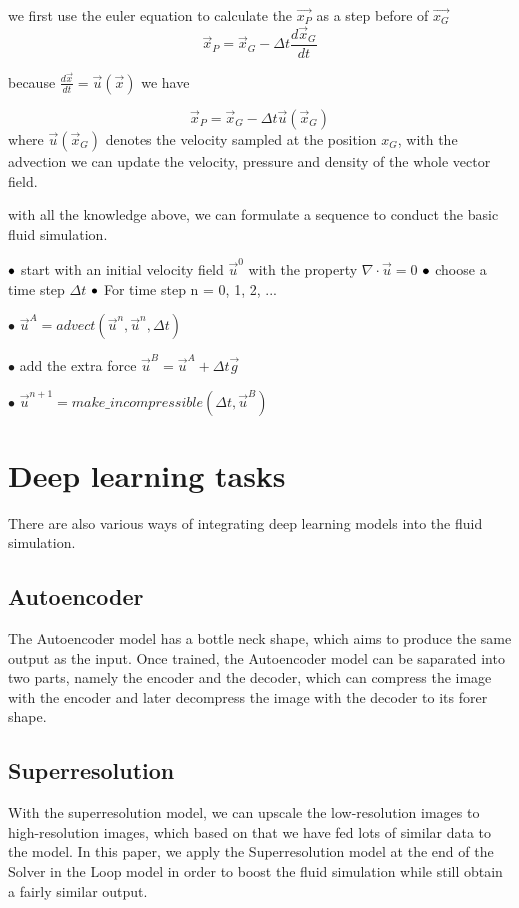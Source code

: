 \documentclass[a4paper,12pt,twoside]{report}
\begin{document}
we first use the euler equation to calculate the $\vec{x_P}$ as a step before of $\vec{x_G}$
\begin{equation}
\vec x_P=\vec x_G-\Delta t\frac{d\vec x_G}{dt}
\end{equation}

because $\frac{d\vec x}{dt}=\vec u(\vec x)$ we have

\begin{equation}
\vec x_P=\vec x_G-\Delta t\vec u(\vec x_G)
\end{equation}
where $\vec u(\vec x_G)$ denotes the velocity sampled at the position $x_G$, with the advection we can update the velocity, pressure and density of the whole vector field.

with all the knowledge above, we can formulate a sequence to conduct the basic fluid simulation.

$\\\bullet$ start with an initial velocity field $\vec{u}^{0}$ with the property ${\nabla}\cdot\vec{u} = 0$
$\\\bullet$ choose a time step $\Delta t$ 
$\\\bullet$ For time step n = 0, 1, 2, ...
\par$\bullet$  $\vec{u}^{A} = advect(\vec{u}^{n}, \vec{u}^{n}, \Delta t)$
 \par$\bullet$  add the extra force $\vec{u}^{B} = \vec{u}^{A} + \Delta t\vec{g}$
 \par$\bullet$  $\vec{u}^{n+1} =make\_incompressible(\Delta t, \vec{u}^{B})$


\section{Deep learning tasks}
There are also various ways of integrating deep learning models into the fluid simulation.
\subsection{Autoencoder}
The Autoencoder model has a bottle neck shape, which aims to produce the same output as the input. Once trained, the Autoencoder model can be saparated into two parts, namely the encoder and the decoder, which can compress the image with the encoder and later decompress the image with the decoder to its forer shape.
\subsection{Superresolution}
With the superresolution model, we can upscale the low-resolution images to high-resolution images, which based on that we have fed lots of similar data to the model. In this paper, we apply the Superresolution model at the end of the Solver in the Loop model in order to boost the fluid simulation while still obtain a fairly similar output.
\end{document}
